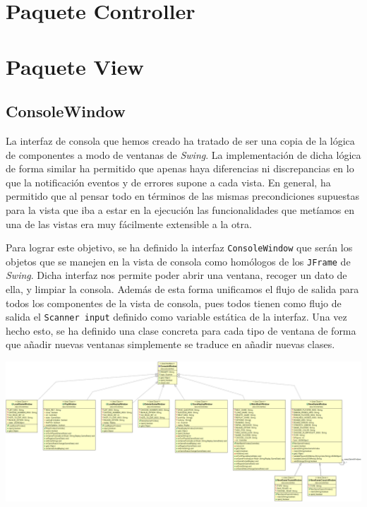 \documentclass[../DocumentoOficial.tex]{subfiles}
\begin{document}
\newpage

\section{Paquete Controller}

\section{Paquete View}
\subsection{ConsoleWindow}
La interfaz de consola que hemos creado ha tratado de ser una copia de la lógica de componentes a modo de ventanas de \textit{Swing}. La implementación de dicha lógica de forma similar ha permitido que apenas haya diferencias ni discrepancias en lo que la notificación eventos y de errores supone a cada vista. En general, ha permitido que al pensar todo en términos de las mismas precondiciones supuestas para la vista que iba a estar en la ejecución las funcionalidades que metíamos en una de las vistas era muy fácilmente extensible a la otra.

Para lograr este objetivo, se ha definido la interfaz \texttt{ConsoleWindow} que serán los objetos que se manejen en la vista de consola como homólogos de los \texttt{JFrame} de \textit{Swing}. Dicha interfaz nos permite poder abrir una ventana, recoger un dato de ella, y limpiar la consola. Además de esta forma unificamos el flujo de salida para todos los componentes de la vista de consola, pues todos tienen como flujo de salida el \texttt{Scanner input} definido como variable estática de la interfaz. Una vez hecho esto, se ha definido una clase concreta para cada tipo de ventana de forma que añadir nuevas ventanas simplemente se traduce en añadir nuevas clases.

\newpage

\begin{center}
\includegraphics[scale=0.25, angle=90]{ConsoleWindow_class.png}
\end{center}
\end{document}
